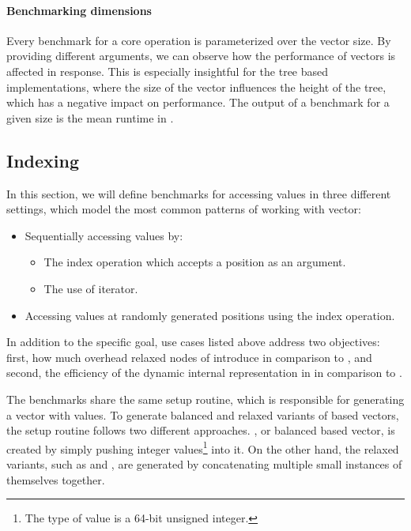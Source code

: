 \paragraph*{Benchmarking dimensions}
Every benchmark for a core operation is parameterized over the vector size. By providing different arguments, we can observe how the performance of vectors is affected in response. This is especially insightful for the tree based implementations, where the size of the vector influences the height of the tree, which has a negative impact on performance. The output of a benchmark for a given size is the mean runtime in \ms{}. 

\subsection{Indexing}
In this section, we will define benchmarks for accessing values in three different settings, which model the most common patterns of working with vector: 

\begin{itemize}
    \item Sequentially accessing values by:    
    \begin{itemize}
        \item The index operation which accepts a position as an argument. 
        \item The use of iterator. 
    \end{itemize}
    \item Accessing values at randomly generated positions using the index operation. 
\end{itemize}

In addition to the specific goal, use cases listed above address two objectives: first, how much overhead relaxed nodes of \rrbtree{} introduce in comparison to \rbtree{}, and second, the efficiency of the dynamic internal representation in \pvec{} in comparison to \stdvec{}.

The benchmarks share the same setup routine, which is responsible for generating a vector with values. To generate balanced and relaxed variants of \rbtree{} based vectors, the setup routine follows two different approaches. \rbvec{}, or balanced \rbtree{} based vector, is created by simply pushing integer values\footnote{The type of value is a 64-bit unsigned integer.} into it. On the other hand, the relaxed variants, such as \rrbvec{} and \pvec{}, are generated by concatenating multiple small instances of themselves together.

